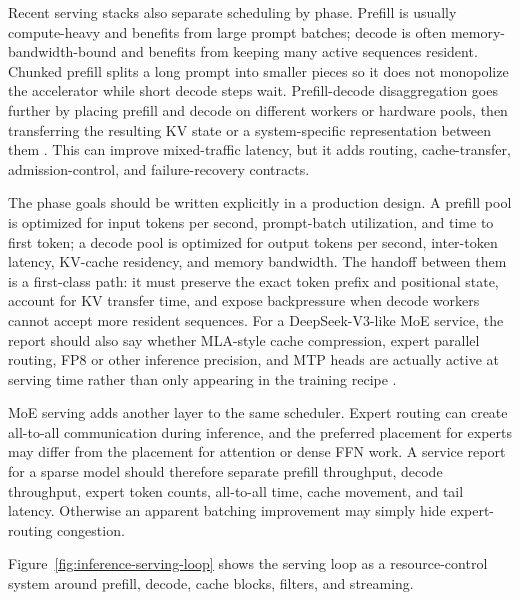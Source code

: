 Recent serving stacks also separate scheduling by phase. Prefill is usually compute-heavy and benefits from large prompt batches; decode is often memory-bandwidth-bound and benefits from keeping many active sequences resident. Chunked prefill splits a long prompt into smaller pieces so it does not monopolize the accelerator while short decode steps wait. Prefill-decode disaggregation goes further by placing prefill and decode on different workers or hardware pools, then transferring the resulting KV state or a system-specific representation between them \cite{feng2025frontier}. This can improve mixed-traffic latency, but it adds routing, cache-transfer, admission-control, and failure-recovery contracts.

The phase goals should be written explicitly in a production design. A prefill pool is optimized for input tokens per second, prompt-batch utilization, and time to first token; a decode pool is optimized for output tokens per second, inter-token latency, KV-cache residency, and memory bandwidth. The handoff between them is a first-class path: it must preserve the exact token prefix and positional state, account for KV transfer time, and expose backpressure when decode workers cannot accept more resident sequences. For a DeepSeek-V3-like MoE service, the report should also say whether MLA-style cache compression, expert parallel routing, FP8 or other inference precision, and MTP heads are actually active at serving time rather than only appearing in the training recipe \cite{deepseek2024v3}.

MoE serving adds another layer to the same scheduler. Expert routing can create all-to-all communication during inference, and the preferred placement for experts may differ from the placement for attention or dense FFN work. A service report for a sparse model should therefore separate prefill throughput, decode throughput, expert token counts, all-to-all time, cache movement, and tail latency. Otherwise an apparent batching improvement may simply hide expert-routing congestion.

Figure~\ref{fig:inference-serving-loop} shows the serving loop as a resource-control system around prefill, decode, cache blocks, filters, and streaming.

